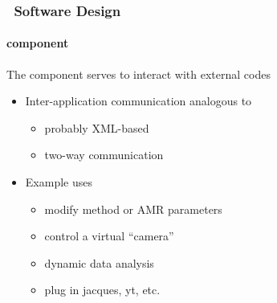\begin{frame}[fragile] 
\frametitle{\cello\ Software Design}
\framesubtitle{ component}
The  component serves to interact with external codes \\
\begin{itemize}
\item{} Inter-application communication analogous to 
\begin{itemize}
\item{}    probably XML-based
\item{}    two-way communication
\end{itemize}
\item{} Example uses
\begin{itemize}
\item{} modify method or AMR parameters
\item{} control a virtual ``camera''
\item{} dynamic data analysis
\item{} plug in jacques, yt, etc.
\end{itemize}
\end{itemize}
\end{frame}
%
%
%
